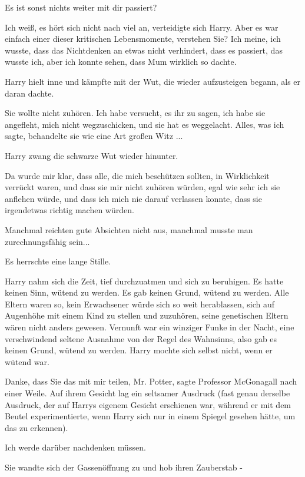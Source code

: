 \glqq{}Es ist sonst nichts weiter mit dir passiert?\grqq{}

\glqq{}Ich weiß, es hört sich nicht nach viel an\grqq{}, verteidigte sich Harry.
\glqq{}Aber es war einfach einer dieser kritischen Lebensmomente, verstehen Sie?
Ich meine, ich wusste, dass das Nichtdenken an etwas nicht verhindert, dass es
passiert, das wusste ich, aber ich konnte sehen, dass Mum wirklich so
dachte.\grqq{}

Harry hielt inne und kämpfte mit der Wut, die wieder aufzusteigen begann, als er
daran dachte.

\glqq{}Sie wollte nicht zuhören. Ich habe versucht, es ihr zu sagen, ich habe sie
angefleht, mich nicht wegzuschicken, und sie hat es weggelacht. Alles, was ich
sagte, behandelte sie wie eine Art großen Witz ...\grqq{}

Harry zwang die schwarze Wut wieder hinunter.

\glqq{}Da wurde mir klar, dass alle, die mich beschützen sollten, in Wirklichkeit
verrückt waren, und dass sie mir nicht zuhören würden, egal wie sehr ich sie
anflehen würde, und dass ich mich nie darauf verlassen konnte, dass sie
irgendetwas richtig machen würden.\grqq{}

Manchmal reichten gute Absichten nicht aus, manchmal musste man zurechnungsfähig
sein...

Es herrschte eine lange Stille.

Harry nahm sich die Zeit, tief durchzuatmen und sich zu beruhigen. Es hatte
keinen Sinn, wütend zu werden. Es gab keinen Grund, wütend zu werden. Alle
Eltern waren so, kein Erwachsener würde sich so weit herablassen, sich auf
Augenhöhe mit einem Kind zu stellen und zuzuhören, seine genetischen Eltern
wären nicht anders gewesen. Vernunft war ein winziger Funke in der Nacht, eine
verschwindend seltene Ausnahme von der Regel des Wahnsinns, also gab es keinen
Grund, wütend zu werden. Harry mochte sich selbst nicht, wenn er wütend war.

\glqq{}Danke, dass Sie das mit mir teilen, Mr. Potter\grqq{}, sagte Professor
McGonagall nach einer Weile. Auf ihrem Gesicht lag ein seltsamer Ausdruck (fast
genau derselbe Ausdruck, der auf Harrys eigenem Gesicht erschienen war, während
er mit dem Beutel experimentierte, wenn Harry sich nur in einem Spiegel gesehen
hätte, um das zu erkennen).

\glqq{}Ich werde darüber nachdenken müssen.\grqq{}

Sie wandte sich der Gassenöffnung zu und hob ihren Zauberstab -

